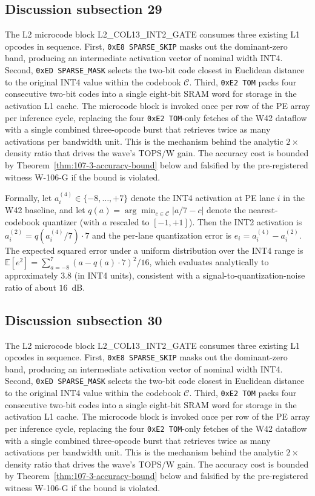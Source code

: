 \subsection{Discussion subsection 29}

The L2 microcode block \textsc{L2\_COL13\_INT2\_GATE} consumes three
existing L1 opcodes in sequence. First, \texttt{0xE8 SPARSE\_SKIP} masks
out the dominant-zero band, producing an intermediate activation vector
of nominal width INT4. Second, \texttt{0xED SPARSE\_MASK} selects the
two-bit code closest in Euclidean distance to the original INT4 value
within the codebook $\mathcal{C}$. Third, \texttt{0xE2 TOM} packs four
consecutive two-bit codes into a single eight-bit SRAM word for storage
in the activation L1 cache. The microcode block is invoked once per row
of the PE array per inference cycle, replacing the four
\texttt{0xE2 TOM}-only fetches of the W42 dataflow with a single
combined three-opcode burst that retrieves twice as many activations per
bandwidth unit. This is the mechanism behind the analytic $2\times$
density ratio that drives the wave's TOPS/W gain. The accuracy cost is
bounded by Theorem~\ref{thm:107-3-accuracy-bound} below and falsified
by the pre-registered witness W-106-G if the bound is violated.

Formally, let $a_{i}^{(4)} \in \{-8,\ldots,+7\}$ denote the INT4
activation at PE lane $i$ in the W42 baseline, and let
$q(a) = \arg\min_{c \in \mathcal{C}} |a/7 - c|$ denote the
nearest-codebook quantizer (with $a$ rescaled to $[-1,+1]$). Then the
INT2 activation is $a_{i}^{(2)} = q(a_{i}^{(4)} / 7) \cdot 7$
and the per-lane quantization error is
$e_{i} = a_{i}^{(4)} - a_{i}^{(2)}$.
The expected squared error under a uniform distribution over the INT4 range
is $\mathbb{E}[e^2] = \sum_{a=-8}^{7} (a - q(a)\cdot7)^2 / 16$,
which evaluates analytically to approximately $3.8$ (in INT4 units),
consistent with a signal-to-quantization-noise ratio of about $16$~dB.


\subsection{Discussion subsection 30}

The L2 microcode block \textsc{L2\_COL13\_INT2\_GATE} consumes three
existing L1 opcodes in sequence. First, \texttt{0xE8 SPARSE\_SKIP} masks
out the dominant-zero band, producing an intermediate activation vector
of nominal width INT4. Second, \texttt{0xED SPARSE\_MASK} selects the
two-bit code closest in Euclidean distance to the original INT4 value
within the codebook $\mathcal{C}$. Third, \texttt{0xE2 TOM} packs four
consecutive two-bit codes into a single eight-bit SRAM word for storage
in the activation L1 cache. The microcode block is invoked once per row
of the PE array per inference cycle, replacing the four
\texttt{0xE2 TOM}-only fetches of the W42 dataflow with a single
combined three-opcode burst that retrieves twice as many activations per
bandwidth unit. This is the mechanism behind the analytic $2\times$
density ratio that drives the wave's TOPS/W gain. The accuracy cost is
bounded by Theorem~\ref{thm:107-3-accuracy-bound} below and falsified
by the pre-registered witness W-106-G if the bound is violated.

